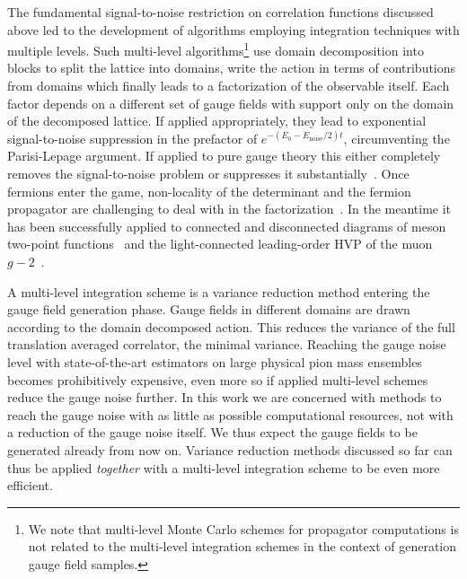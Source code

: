 The fundamental signal-to-noise restriction on correlation functions discussed above led to the development of algorithms employing integration techniques with multiple levels.
Such multi-level algorithms\footnote{We note that multi-level Monte Carlo schemes for propagator computations is not related to the multi-level integration schemes in the context of generation gauge field samples.} use domain decomposition into blocks  to split the lattice into domains, write the action in terms of contributions from domains which finally leads to a factorization of the observable itself.
Each factor depends on a different set of gauge fields with support only on the domain of the decomposed lattice.
If applied appropriately, they lead to exponential signal-to-noise suppression in the prefactor of $e^{-(E_0 - E_{\text{noise}}/2)t}$, circumventing the Parisi-Lepage argument.
If applied to pure gauge theory this either completely removes the signal-to-noise problem or suppresses it substantially~\cite{Luscher:2001up,Meyer:2002cd,DellaMorte:2007zz,DellaMorte:2008jd,della2011novel}.
Once fermions enter the game, non-locality of the determinant and the fermion propagator are challenging to deal with in the factorization~\cite{Ce:2016idq,Ce:2016ajy,Giusti:2017ksp,Ce:2017ndt}.
In the meantime it has been successfully applied to connected and disconnected diagrams of meson two-point functions~\cite{Giusti:2018vxm} and the light-connected leading-order HVP of the muon $g-2$~\cite{DallaBrida:2020cik,Giusti:2021qhk}.

A multi-level integration scheme is a variance reduction method entering the gauge field generation phase.
Gauge fields in different domains are drawn according to the domain decomposed action.
This reduces the variance of the full translation averaged correlator, \ie the minimal variance. %
Reaching the gauge noise level with state-of-the-art estimators on large physical pion mass ensembles becomes prohibitively expensive, even more so if applied multi-level schemes reduce the gauge noise further.
In this work we are concerned with methods to reach the gauge noise with as little as possible computational resources, not with a reduction of the gauge noise itself.
We thus expect the gauge fields to be generated already from now on.
Variance reduction methods discussed so far can thus be applied \emph{together} with a multi-level integration scheme to be even more efficient. 

